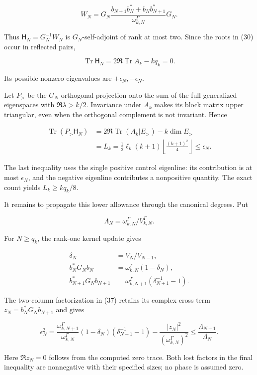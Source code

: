 \documentclass[
  11pt,
]{article}
\begin{document}
\[
W_N=G_N\frac{b_{N+1}b_N^*+b_Nb_{N+1}^*}
{\omega_{k,N}^\Gamma}G_N.
\tag{37}
\]

Thus \(\mathsf H_N=G_N^{-1}W_N\) is \(G_N\)-self-adjoint of rank at most
two. Since the roots in (30) occur in reflected pairs,

\[
\operatorname{Tr}\mathsf H_N
=2\Re\operatorname{Tr}A_k-kq_k=0.
\]

Its possible nonzero eigenvalues are \(+\epsilon_N,-\epsilon_N\).

Let \(P_>\) be the \(G_N\)-orthogonal projection onto the sum of the
full generalized eigenspaces with \(\Re\lambda>k/2\). Invariance under
\(A_k\) makes its block matrix upper triangular, even when the
orthogonal complement is not invariant. Hence

\[
\begin{aligned}
\operatorname{Tr}(P_>\mathsf H_N)
&=2\Re\operatorname{Tr}(A_k|E_>)-k\dim E_>\\
&=L_k=\frac12\ell_k(k+1)
\left\lfloor\frac{(k+1)^2}{4}\right\rfloor
\le\epsilon_N.
\end{aligned}
\tag{38}
\]

The last inequality uses the single positive control eigenline: its
contribution is at most \(\epsilon_N\), and the negative eigenline
contributes a nonpositive quantity. The exact count yields
\(L_k\ge kq_k/8\).

It remains to propagate this lower allowance through the canonical
degrees. Put

\[
\Lambda_N=\omega_{k,N}^\Gamma/V_{k,N}^\Gamma.
\]

For \(N\ge q_k\), the rank-one kernel update gives

\[
\begin{aligned}
\delta_N&=V_N/V_{N-1},\\
b_N^*G_Nb_N&=\omega_{k,N}^\Gamma(1-\delta_N),\\
b_{N+1}^*G_Nb_{N+1}
&=\omega_{k,N+1}^\Gamma(\delta_{N+1}^{-1}-1).
\end{aligned}
\tag{39}
\]

The two-column factorization in (37) retains its complex cross term
\(z_N=b_N^*G_Nb_{N+1}\) and gives

\[
\epsilon_N^2=
\frac{\omega_{k,N+1}^\Gamma}{\omega_{k,N}^\Gamma}
(1-\delta_N)(\delta_{N+1}^{-1}-1)
-\frac{|z_N|^2}{(\omega_{k,N}^\Gamma)^2}
\le\frac{\Lambda_{N+1}}{\Lambda_N}.
\tag{40}
\]

Here \(\Re z_N=0\) follows from the computed zero trace. Both lost
factors in the final inequality are nonnegative with their specified
sizes; no phase is assumed zero.
\end{document}
